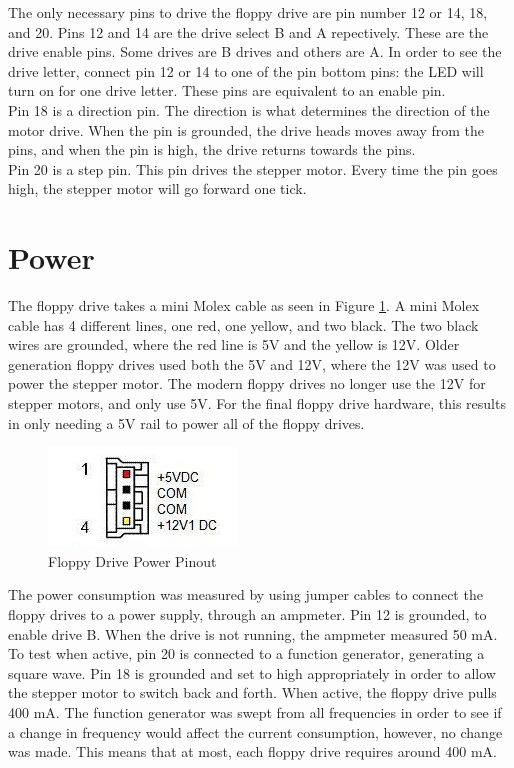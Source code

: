 \documentclass[11pt, a4paper]{report}
\begin{document}
The only necessary pins to drive the floppy drive are pin number 12 or 14, 18, and 20. Pins 12 and 14 are the drive select B and A repectively. These are the drive enable pins. Some drives are B drives and others are A. In order to see the drive letter, connect pin 12 or 14 to one of the pin bottom pins: the LED will turn on for one drive letter. These pins are equivalent to an enable pin.\\

Pin 18 is a direction pin. The direction is what determines the direction of the motor drive. When the pin is grounded, the drive heads moves away from the pins, and when the pin is high, the drive returns towards the pins. \\

Pin 20 is a step pin. This pin drives the stepper motor. Every time the pin goes high, the stepper motor will go forward one tick.\\

\section{Power}

The floppy drive takes a mini Molex cable as seen in Figure \ref{fig:miniMolex}. A mini Molex cable has 4 different lines, one red, one yellow, and two black. The two black wires are grounded, where the red line is 5V and the yellow is 12V. Older generation floppy drives used both the 5V and 12V, where the 12V was used to power the stepper motor. The modern floppy drives no longer use the 12V for stepper motors, and only use 5V. For the final floppy drive hardware, this results in only needing a 5V rail to power all of the floppy drives.

\begin{figure}[H]
\hspace*{-2cm}    
    \centering
    \includegraphics[width=.4\textwidth]{miniMolex.jpg}
    \caption{Floppy Drive Power Pinout}
    \label{fig:miniMolex}
\end{figure}


The power consumption was measured by using jumper cables to connect the floppy drives to a power supply, through an ampmeter. Pin 12 is grounded, to enable drive B. When the drive is not running, the ampmeter measured 50 mA. To test when active, pin 20 is connected to a function generator, generating a square wave. Pin 18 is grounded and set to high appropriately in order to allow the stepper motor to switch back and forth. When active, the floppy drive pulls 400 mA. The function generator was swept from all frequencies in order to see if a change in frequency would affect the current consumption, however, no change was made. This means that at most, each floppy drive requires around 400 mA. \\
\end{document}
